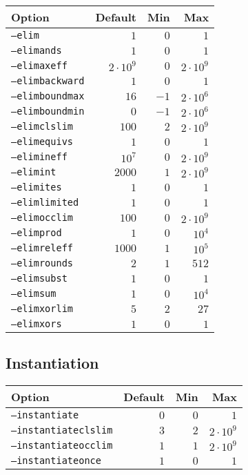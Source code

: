 \documentclass{article}
\begin{document}
\begin{tabular}{l|rrr}
    Option & Default & Min & Max \\
    \hline
    \texttt{--elim}        & $1$    & $0$  & $1$ \\
    \texttt{--elimands}    & $1$    & $0$  & $1$ \\
    \texttt{--elimaxeff}   & $2 \cdot 10^9$ & $0$  & $2 \cdot 10^9$ \\
    \texttt{--elimbackward}& $1$    & $0$  & $1$ \\
    \texttt{--elimboundmax}& $16$   & $-1$ & $2 \cdot 10^6$ \\
    \texttt{--elimboundmin}& $0$    & $-1$ & $2 \cdot 10^6$ \\
    \texttt{--elimclslim}  & $100$  & $2$  & $2 \cdot 10^9$ \\
    \texttt{--elimequivs}  & $1$    & $0$  & $1$ \\
    \texttt{--elimineff}   & $10^7$ & $0$  & $2 \cdot 10^9$ \\
    \texttt{--elimint}     & $2000$ & $1$  & $2 \cdot 10^9$ \\
    \texttt{--elimites}    & $1$    & $0$  & $1$ \\
    \texttt{--elimlimited} & $1$    & $0$  & $1$ \\
    \texttt{--elimocclim}  & $100$  & $0$  & $2 \cdot 10^9$ \\
    \texttt{--elimprod}    & $1$    & $0$  & $10^4$ \\
    \texttt{--elimreleff}  & $1000$ & $1$  & $10^5$ \\
    \texttt{--elimrounds}  & $2$    & $1$  & $512$ \\
    \texttt{--elimsubst}   & $1$    & $0$  & $1$ \\
    \texttt{--elimsum}     & $1$    & $0$  & $10^4$ \\
    \texttt{--elimxorlim}  & $5$    & $2$  & $27$ \\
    \texttt{--elimxors}    & $1$    & $0$  & $1$ \\
\end{tabular}

\subsection{Instantiation}
\begin{tabular}{l|rrr}
    Option & Default & Min & Max \\
    \hline
    \texttt{--instantiate}       & $0$  & $0$  & $1$ \\
    \texttt{--instantiateclslim} & $3$  & $2$  & $2 \cdot 10^9$ \\
    \texttt{--instantiateocclim} & $1$  & $1$  & $2 \cdot 10^9$ \\
    \texttt{--instantiateonce}   & $1$  & $0$  & $1$ \\
\end{tabular}
\end{document}
